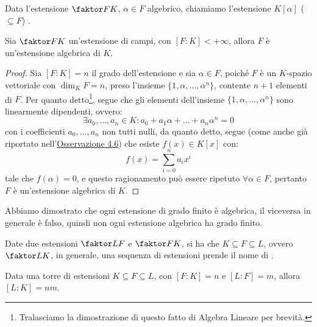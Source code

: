 \documentclass[11pt]{scrartcl}
\begin{document}
\begin{definition}
Data l'estensione $\faktor FK$, $\alpha \in F$ algebrico, chiamiamo l'estensione $K[\alpha]$ ($\subseteq F$) .
\end{definition}

\begin{proposition}
\label{es:4.22}
Sia $\faktor FK$ un'estensione di campi, con $[F:K]<+\infty$, allora $F$ è un'estensione algebrica di $K$.
\end{proposition}

\begin{proof}
Sia $[F:K] = n$ il grado dell'estensione e sia $\alpha \in F$, poiché $F$ è un $K$-spazio vettoriale con $\dim_KF=n$, preso l'insieme $\{1,\alpha,\ldots,\alpha^n\}$, contente $n+1$ elementi di $F$. Per quanto detto\footnote{Tralasciamo la dimostrazione di questo fatto di Algebra Lineare per brevità.}, segue che gli elementi dell'insieme $\{1,\alpha,\ldots,\alpha^n\}$ sono linearmente dipendenti, ovvero:
	\[ \exists a_0,\ldots,a_n \in K : a_0+a_1\alpha + \ldots + a_n\alpha^n = 0
	\]
con i coefficienti $a_0,\ldots,a_n$ non tutti nulli, da quanto detto, segue (come anche già riportato nell'\hyperref[ec:4.6]{Osservazione 4.6}) che esiste $f(x) \in K[x]$ con:
	\[ f(x) = \sum_{i=0}^n a_ix^i
	\]
tale che $f(\alpha) = 0$, e questo ragionamento può essere ripetuto $\forall \alpha \in F$, pertanto $F$ è un'estensione algebrica di $K$.
\end{proof}

\begin{remark}
Abbiamo dimostrato che ogni estensione di grado finito è algebrica, il viceversa in generale è falso, quindi non ogni estensione algebrica ha grado finito.
\end{remark}

\begin{definition}
Date due estensioni $\faktor LF$ e $\faktor FK$, si ha che $K \subseteq F \subseteq L$, ovvero $\faktor LK$, in generale, una sequenza di estensioni prende il nome di .
\end{definition}
\begin{center}
\end{center}

\begin{theorem}
\label{es:Torri}
Data una torre di estensioni $K \subseteq F \subseteq L$, con $[F:K] = n$ e $[L:F] = m$, allora $[L:K]=nm$.
\end{theorem}
\end{document}
